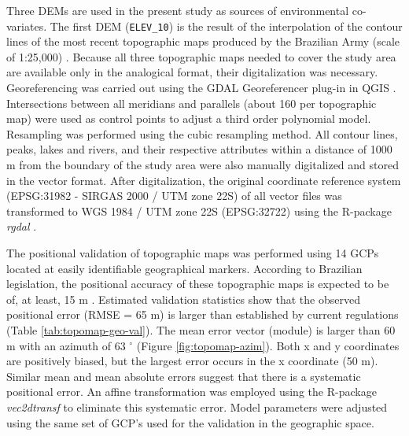 Three DEMs are used in the present study as sources of environmental co-variates. The first DEM (\texttt{ELEV\_10}) is the result of the interpolation of the contour lines of the most recent topographic maps produced by the Brazilian Army (scale of 1:25,000) \cite{DSG1980, DSG1992, DSG1992a}. Because all three topographic maps needed to cover the study area are available only in the analogical format, their digitalization was necessary. Georeferencing was carried out using the GDAL Georeferencer plug-in in QGIS \cite{GDAL2013, QGIS2013}. Intersections between all meridians and parallels (about 160 per topographic map) were used as control points to adjust a third order polynomial model. Resampling was performed using the cubic resampling method. All contour lines, peaks, lakes and rivers, and their respective attributes within a distance of 1000 m from the boundary of the study area were also manually digitalized and stored in the vector format. After digitalization, the original coordinate reference system (EPSG:31982 - SIRGAS 2000 / UTM zone 22S) of all vector files was transformed to WGS 1984 / UTM zone 22S (EPSG:32722) using the R-package \textit{rgdal} \cite{BivandEtAl2013a}.

The positional validation of topographic maps was performed using 14 GCPs located at easily identifiable geographical markers. According to Brazilian legislation, the positional accuracy of these topographic maps is expected to be of, at least, 15 m \cite{Brasil1984}. Estimated validation statistics show that the observed positional error (RMSE = 65 m) is larger than established by current regulations (Table \ref{tab:topomap-geo-val}). The mean error vector (module) is larger than 60 m with an azimuth of 63 $^{\circ}$ (Figure \ref{fig:topomap-azim}). Both x and y coordinates are positively biased, but the largest error occurs in the x coordinate (50 m). Similar mean and mean absolute errors suggest that there is a systematic positional error. An affine transformation was employed using the R-package \textit{vec2dtransf} \cite{Carrillo2012} to eliminate this systematic error. Model parameters were adjusted using the same set of GCP's used for the validation in the geographic space.

